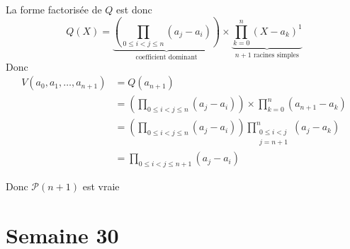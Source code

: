 \documentclass{article}
\renewenvironment{question_kholle}[2][ ]
{
	\subsection{\texorpdfstring{#2}{}}
	\notblank{#1}
	{
		\noindent #1
		\bigbreak
	}
	{}
	\begin{proof}
}
{
	\end{proof}
}
\begin{document}
\begin{question_kholle}
\begin{itemize}[label=$\lozenge$]
\begin{itemize}
			            La forme factorisée de $Q$ est donc
			            $$
				            Q(X)=\underbrace{ \left( \prod_{0\leqslant i < j \leqslant n} (a_{j}-a_{i})\right) }_{ \text{coefficient dominant} } \times \underbrace{ \prod_{k=0}^{n}(X-a_{k})^{1} }_{ n+1 \text{ racines simples} }
			            $$
			            Donc
			            \begin{align*}
				            V(a_{0}, a_{1},\dots, a_{n+1}) & =Q(a_{n+1})                                                                                                \\
				                                           & =  \left( \prod_{0\leqslant i < j \leqslant n} (a_{j}-a_{i})\right) \times  \prod_{k=0}^{n}(a_{n+1}-a_{k}) \\
				                                           & = \left( \prod_{0\leqslant i < j \leqslant n} (a_{j}-a_{i})\right) \prod_{\substack{0\leqslant i<j         \\ j=n+1}}^{n}(a_{j}-a_{k}) \\
				                                           & = \prod_{0\leqslant i < j \leqslant n+1} (a_{j}-a_{i})
			            \end{align*}

			            Donc $\mathcal{P}(n+1)$ est vraie
		      \end{itemize}
	\end{itemize}
\end{question_kholle}
\pagebreak\section{Semaine 30}
\end{document}
